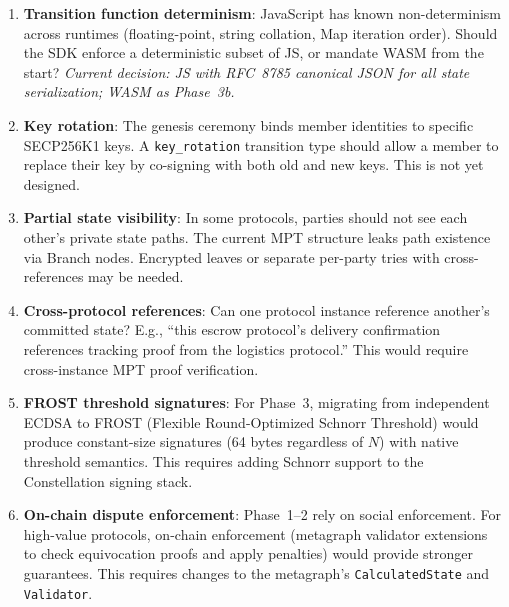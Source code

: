 \documentclass[11pt,a4paper]{article}
\begin{document}
\begin{enumerate}
  \item \textbf{Transition function determinism}: JavaScript has known
    non-determinism across runtimes (floating-point, string collation,
    Map iteration order). Should the SDK enforce a deterministic subset of
    JS, or mandate WASM from the start? \emph{Current decision: JS with RFC~8785
    canonical JSON for all state serialization; WASM as Phase~3b.}

  \item \textbf{Key rotation}: The genesis ceremony binds member identities
    to specific SECP256K1 keys. A \texttt{key\_rotation} transition type
    should allow a member to replace their key by co-signing with both old
    and new keys. This is not yet designed.

  \item \textbf{Partial state visibility}: In some protocols, parties should
    not see each other's private state paths. The current MPT structure leaks
    path existence via Branch nodes. Encrypted leaves or separate per-party
    tries with cross-references may be needed.

  \item \textbf{Cross-protocol references}: Can one protocol instance
    reference another's committed state? E.g., ``this escrow protocol's
    delivery confirmation references tracking proof from the logistics
    protocol.'' This would require cross-instance MPT proof verification.

  \item \textbf{FROST threshold signatures}: For Phase~3, migrating from
    independent ECDSA to FROST (Flexible Round-Optimized Schnorr Threshold)
    would produce constant-size signatures (64 bytes regardless of $N$) with
    native threshold semantics. This requires adding Schnorr support to the
    Constellation signing stack.

  \item \textbf{On-chain dispute enforcement}: Phase~1--2 rely on social
    enforcement. For high-value protocols, on-chain enforcement (metagraph
    validator extensions to check equivocation proofs and apply penalties)
    would provide stronger guarantees. This requires changes to the
    metagraph's \texttt{CalculatedState} and \texttt{Validator}.
\end{enumerate}
\end{document}
